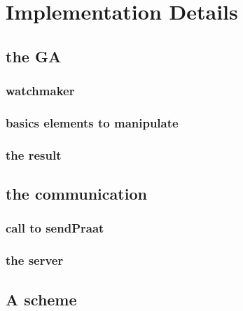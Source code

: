 \documentclass[12pt]{report}
\begin{document}
\part{Implementation Details}
\chapter{the GA}
\section{watchmaker}
\section{basics elements to manipulate}
\section{the result}

\chapter{the communication}
\section{call to sendPraat}
\section{the server}
\appendix
\chapter{A scheme}

\listoffigures
\listoftables

 
\end{document}
